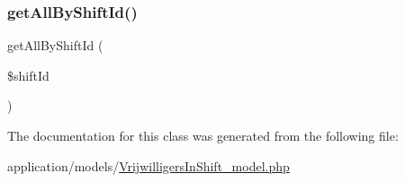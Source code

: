 \subsubsection{\texorpdfstring{get\+All\+By\+Shift\+Id()}{getAllByShiftId()}}
{\footnotesize\ttfamily get\+All\+By\+Shift\+Id (\begin{DoxyParamCaption}\item[{}]{\$shift\+Id }\end{DoxyParamCaption})}



The documentation for this class was generated from the following file\+:\begin{DoxyCompactItemize}
\item 
application/models/\mbox{\hyperlink{_vrijwilligers_in_shift__model_8php}{Vrijwilligers\+In\+Shift\+\_\+model.\+php}}\end{DoxyCompactItemize}
